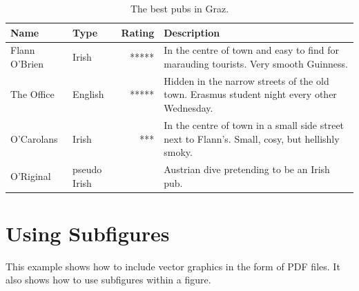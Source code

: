 \begin{table}[tp]
\centering
\begin{tabularx}{\linewidth}{|llrX|}
\hline
Name & Type & Rating & Description \\
\hline
Flann O'Brien &
Irish &
***** &
In the centre of town and easy to find for
marauding tourists. Very smooth Guinness.
\\
\hline
The Office &
English &
***** &
Hidden in the narrow streets of the old town.
Erasmus student night every other Wednesday.
\\
\hline
O'Carolans &
Irish &
*** &
In the centre of town in a small side street next to Flann's.
Small, cosy, but hellishly smoky.
\\
\hline
O'Riginal &
pseudo Irish &
 &
Austrian dive pretending to be an Irish pub.
\\
\hline
\end{tabularx}

\caption[Best Pubs in Graz]
{
The best pubs in Graz.
}
\label{tab:BestPubs}
\end{table}





\section{Using Subfigures}

This example shows how to include vector graphics in the form of PDF
files. It also shows how to use subfigures within a figure.

